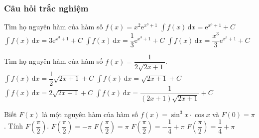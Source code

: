 \subsubsection{Câu hỏi trắc nghiệm}	
\begin{ex}%
	Tìm họ nguyên hàm của hàm số $f(x)=x^2\mathrm{e}^{x^3+1}$ 
	\choice
	{$\displaystyle\int f(x)\mathrm{\,d}x=\mathrm{e}^{x^3+1}+C$}
	{$\displaystyle\int f(x)\mathrm{\,d}x=3\mathrm{e}^{x^3+1}+C$}
	{\True $\displaystyle\int f(x)\mathrm{\,d}x=\dfrac{1}{3}\mathrm{e}^{x^3+1}+C$}
	{$\displaystyle\int f(x)\mathrm{\,d}x=\dfrac{x^3}{3}\mathrm{e}^{x^3+1}+C$}
\end{ex}
\begin{ex}%
	Tìm họ nguyên hàm của hàm số $f(x)=\dfrac{1}{2\sqrt{2x+1}}$. 
	\choice
	{\True $\displaystyle\int f(x)\mathrm{\,d}x=\dfrac{1}{2}\sqrt{2x+1}+C$}
	{$\displaystyle\int f(x)\mathrm{\,d}x=\sqrt{2x+1}+C$}
	{$\displaystyle\int f(x)\mathrm{\,d}x=2\sqrt{2x+1}+C$}
	{$\displaystyle\int f(x)\mathrm{\,d}x=\dfrac{1}{(2x+1)\sqrt{2x+1}}+C$}
\end{ex}
\begin{ex}%
	Biết $F(x)$ là một nguyên hàm của hàm số $f(x)=\sin^3x\cdot\cos x$ và $F(0)=\pi$. Tính $F\left(\dfrac{\pi}{2}\right)$. 
	\choice
	{$F\left(\dfrac{\pi}{2}\right)=-\pi$}
	{$F\left(\dfrac{\pi}{2}\right)=\pi$}
	{$F\left(\dfrac{\pi}{2}\right)=-\dfrac{1}{4}+\pi$}
	{\True $F\left(\dfrac{\pi}{2}\right)=\dfrac{1}{4}+\pi$}
\end{ex}
